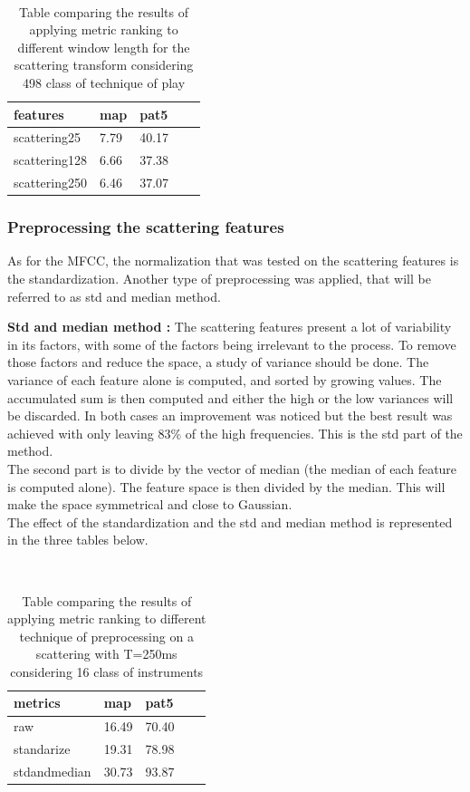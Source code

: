 \documentclass[hidelinks,12pt]{report}
\begin{document}
\begin{table} [H]
\begin{center} 
\ 
 \setlength{\tabcolsep}{.16667em} 
\begin{tabular}{ | l | l | l | l | l |}
features & map & pat5  \\ 
\hline 
scattering25 &  7.79 & 40.17  \\ 

scattering128  &  6.66 & 37.38 \\ 

scattering250  &  6.46 & 37.07 \\ 
 
\end{tabular} 
\end{center} 
\caption{Table comparing the results of applying metric ranking to different window length for the scattering transform considering 498 class of technique of play} 
\label{you} 
\end{table}
\subsubsection{Preprocessing the scattering features}
As for the MFCC, the normalization that was tested on the scattering features is the standardization. Another type of preprocessing was applied, that will be referred to as std and median method.\par
\textbf{Std and median method :} The scattering features present a lot of variability in its factors, with some of the factors being irrelevant to the process. To remove those factors and reduce the space, a study of variance should be done. The variance of each feature alone is computed, and sorted by growing values. The accumulated sum is then computed and either the high or the low variances will be discarded. In both cases an improvement was noticed but the best result was achieved with only leaving 83\% of the high frequencies. This is the std part of the method. \\
The second part is to divide by the vector of median (the median of each feature is computed alone). The feature space is then divided by the median. This will make the space symmetrical and close to Gaussian.\\
The effect of the standardization and the std and median method is represented in the three tables below.
\begin{table} [H]
\begin{center} 
\ 
 \setlength{\tabcolsep}{.16667em} 
\begin{tabular}{ | l | l | l | l | l |}
metrics & map & pat5  \\ 
\hline 
raw & 16.49 & 70.40  \\ 
standarize & 19.31 & 78.98 \\ 
stdandmedian & 30.73 & 93.87 \\ 
 
\end{tabular} 
\end{center} 
\caption{Table comparing the results of applying metric ranking to different technique of preprocessing on a scattering with T=250ms considering 16 class of instruments} 
\label{you} 
\end{table}
\end{document}
